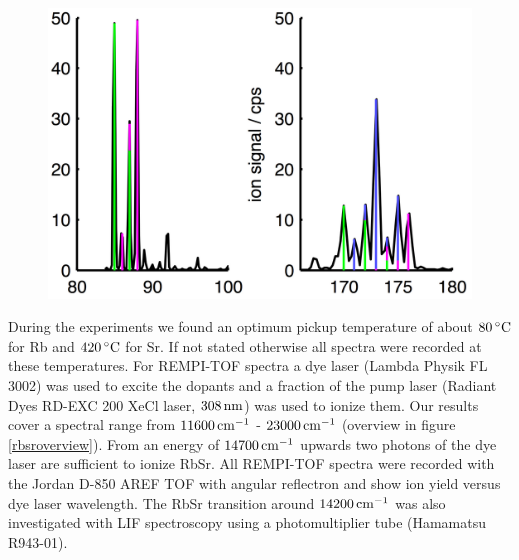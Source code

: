 \documentclass[parskip,12pt,headsepline,a4paper] {scrbook}
\begin{document}
\begin{figure}[ht]
\centerline{
\includegraphics[width=12cm]{./resultsRbSr/rbsr_masses.jpg}}
\end{figure}

During the experiments we found an optimum pickup temperature of about $\unit[80]{^\circ C}$ for Rb and $\unit[420]{^\circ C}$ for Sr. If not stated otherwise all spectra were recorded at these temperatures. For REMPI-TOF spectra a dye laser (Lambda Physik FL 3002) was used to excite the dopants and a fraction of the pump laser (Radiant Dyes RD-EXC 200 XeCl laser, $\unit[308]{nm}$) was used to ionize them. Our results cover a spectral range from $\unit[11600]{cm^{-1}}$ - $\unit[23000]{cm^{-1}}$ (overview in figure \ref{rbsroverview}). From an energy of $\unit[14700]{cm^{-1}}$ upwards two photons of the dye laser are sufficient to ionize RbSr. All REMPI-TOF spectra were recorded with the Jordan D-850 AREF TOF with angular reflectron and show ion yield versus dye laser wavelength. The RbSr transition around $\unit[14200]{cm^{-1}}$ was also investigated with LIF spectroscopy using a photomultiplier tube (Hamamatsu R943-01). %
\end{document}
